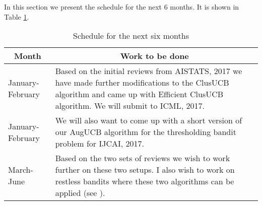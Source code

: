 In this section we present the schedule for the next 6 months. It is shown in Table \ref{tab:schedule}.

\begin{table}[!h]
\caption{Schedule for the next six months}
\label{tab:schedule}
\begin{center}
\begin{tabular}{p{2cm}p{12cm}}
\multicolumn{1}{c}{\bf Month} &\multicolumn{1}{c}{\bf Work to be done } 
\\\midrule
January-February        &Based on the initial reviews from AISTATS, 2017 we have made further modifications to the ClusUCB algorithm and came up with Efficient ClusUCB algorithm. We will submit to ICML, 2017. \\\midrule
January-February	&We will also want to come up with a short version of our AugUCB algorithm for the thresholding bandit problem for IJCAI, 2017.\\\midrule
March-June	&Based on the two sets of reviews we wish to work further on these two setups. I also wish to work on restless bandits where these two algorithms can be applied (see \cite{garivier2011upper}).\\\midrule 
\end{tabular}
\end{center}
\end{table}